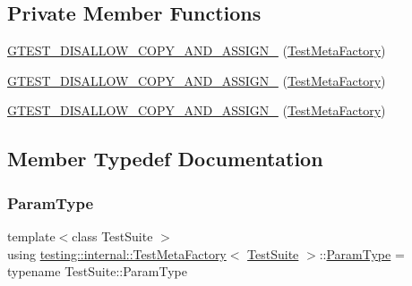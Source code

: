 \subsection*{Private Member Functions}
\begin{DoxyCompactItemize}
\item 
\mbox{\hyperlink{classtesting_1_1internal_1_1_test_meta_factory_a058168d58de97a9d8dfb7400ad878148}{G\+T\+E\+S\+T\+\_\+\+D\+I\+S\+A\+L\+L\+O\+W\+\_\+\+C\+O\+P\+Y\+\_\+\+A\+N\+D\+\_\+\+A\+S\+S\+I\+G\+N\+\_\+}} (\mbox{\hyperlink{classtesting_1_1internal_1_1_test_meta_factory}{Test\+Meta\+Factory}})
\item 
\mbox{\hyperlink{classtesting_1_1internal_1_1_test_meta_factory_a058168d58de97a9d8dfb7400ad878148}{G\+T\+E\+S\+T\+\_\+\+D\+I\+S\+A\+L\+L\+O\+W\+\_\+\+C\+O\+P\+Y\+\_\+\+A\+N\+D\+\_\+\+A\+S\+S\+I\+G\+N\+\_\+}} (\mbox{\hyperlink{classtesting_1_1internal_1_1_test_meta_factory}{Test\+Meta\+Factory}})
\item 
\mbox{\hyperlink{classtesting_1_1internal_1_1_test_meta_factory_a058168d58de97a9d8dfb7400ad878148}{G\+T\+E\+S\+T\+\_\+\+D\+I\+S\+A\+L\+L\+O\+W\+\_\+\+C\+O\+P\+Y\+\_\+\+A\+N\+D\+\_\+\+A\+S\+S\+I\+G\+N\+\_\+}} (\mbox{\hyperlink{classtesting_1_1internal_1_1_test_meta_factory}{Test\+Meta\+Factory}})
\end{DoxyCompactItemize}


\subsection{Member Typedef Documentation}
\mbox{\label{classtesting_1_1internal_1_1_test_meta_factory_a392ebab15dfdcfa1b54bbe15878aa9cd}} 
\subsubsection{\texorpdfstring{ParamType}{ParamType}\hspace{0.1cm}{\footnotesize\ttfamily [1/3]}}
{\footnotesize\ttfamily template$<$class Test\+Suite $>$ \\
using \mbox{\hyperlink{classtesting_1_1internal_1_1_test_meta_factory}{testing\+::internal\+::\+Test\+Meta\+Factory}}$<$ \mbox{\hyperlink{classtesting_1_1_test_suite}{Test\+Suite}} $>$\+::\mbox{\hyperlink{classtesting_1_1internal_1_1_test_meta_factory_a392ebab15dfdcfa1b54bbe15878aa9cd}{Param\+Type}} =  typename Test\+Suite\+::\+Param\+Type}

